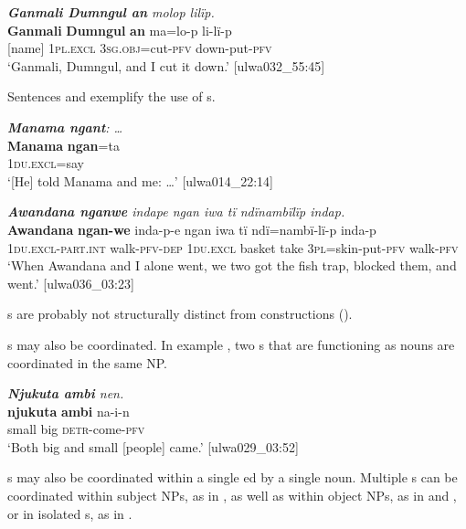\ea%
    \label{ex:complex:9}
            \textit{\textbf{Ganmali Dumngul an} molop lilïp.}\\
\gll    \textbf{Ganmali}  \textbf{Dumngul}  \textbf{an}      ma=lo-p      li-lï-p\\
    [name]    [name]    1\textsc{pl.excl}  3\textsc{sg.obj}=cut-\textsc{pfv}  down-put-\textsc{pfv}\\
\glt `Ganmali, Dumngul, and I cut it down.’ [ulwa032\_55:45]
\z

Sentences  and  exemplify the use of s.

\ea%
    \label{ex:complex:10}
          \textit{\textbf{Manama ngant}: …}\\
\gll    \textbf{Manama}  \textbf{ngan}=ta\\
    [name]  1\textsc{du.excl}=say\\
\glt `[He] told Manama and me: …’ [ulwa014\_22:14]
\z

\ea%
    \label{ex:complex:11}
          \textit{\textbf{Awandana nganwe} indape ngan iwa tï ndïnambïlïp indap.}\\
\gll    \textbf{Awandana}  \textbf{ngan-we}        inda-p-e    ngan     iwa      tï    ndï=nambï-lï-p    inda-p\\
    [name]      \textsc{1du.excl-part.int}  walk-\textsc{pfv-dep}  \textsc{1du.excl}    basket  take  3\textsc{pl}=skin-put-\textsc{pfv}  walk-\textsc{pfv}\\
\glt `When Awandana and I alone went, we two got the fish trap, blocked them, and went.’ [ulwa036\_03:23]
\z

s are probably not structurally distinct from  constructions ().

  s may also be coordinated. In example , two s that are functioning as nouns are coordinated in the same NP.

\ea%
    \label{ex:complex:12}
          \textit{\textbf{Njukuta ambi} nen.}\\
\gll    \textbf{njukuta}  \textbf{ambi}  na-i-n\\
    small    big    \textsc{detr-}come-\textsc{pfv}\\
\glt `Both big and small [people] came.’ [ulwa029\_03:52]
\z

s may also be coordinated within a single  ed by a single noun. Multiple s can be coordinated within subject NPs, as in , as well as within object NPs, as in  and , or in isolated s, as in .

